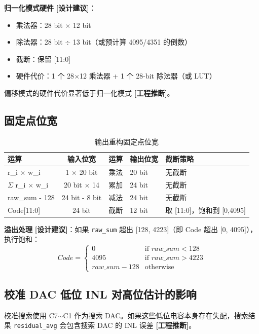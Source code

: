 \documentclass[UTF8,a4paper,11pt]{ctexart}
\newcommand{\inferred}{\textcolor{inferorange}{\textbf{[工程推断]}}}
\newcommand{\suggested}{\textcolor{suggestblue}{\textbf{[设计建议]}}}
\begin{document}
\textbf{归一化模式硬件} \suggested：
\begin{itemize}[leftmargin=2em]
\item 乘法器：28 bit $\times$ 12 bit
\item 除法器：28 bit $\div$ 13 bit（或预计算 4095/4351 的倒数）
\item 截断：保留 [11:0]
\item 硬件代价：1 个 28$\times$12 乘法器 + 1 个 28-bit 除法器（或 LUT）
\end{itemize}

偏移模式的硬件代价显著低于归一化模式 \inferred。

\subsection{固定点位宽}

\begin{table}[H]
\centering
\caption{输出重构固定点位宽}
\label{tab:recon-bitwidth}
\begin{tabular}{lccll}
\toprule
运算 & 输入位宽 & 运算 & 输出位宽 & 截断策略 \\
\midrule
r\_i $\times$ w\_i & 1 $\times$ 20 bit & 乘法 & 20 bit & 无截断 \\
$\Sigma$ r\_i $\times$ w\_i & 20 bit $\times$ 14 & 累加 & 24 bit & 无截断 \\
raw\_sum - 128 & 24 bit - 8 bit & 减法 & 24 bit & 无截断 \\
Code[11:0] & 24 bit & 截断 & 12 bit & 取 [11:0]，饱和到 [0,4095] \\
\bottomrule
\end{tabular}
\end{table}

\textbf{溢出处理} \suggested：如果 \texttt{raw\_sum} 超出 [128, 4223]（即 Code 超出 [0, 4095]），执行饱和：
\begin{equation}
Code = \begin{cases} 0 & \text{if } raw\_sum < 128 \\ 4095 & \text{if } raw\_sum > 4223 \\ raw\_sum - 128 & \text{otherwise} \end{cases}
\label{eq:overflow}
\end{equation}

\subsection{校准 DAC 低位 INL 对高位估计的影响}

校准搜索使用 C7$\sim$C1 作为搜索 DAC。如果这些低位电容本身存在失配，搜索结果 \texttt{residual\_avg} 会包含搜索 DAC 的 INL 误差 \inferred。
\end{document}
